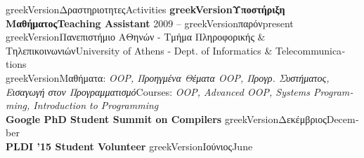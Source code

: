 \documentclass[a4paper]{resume}
\newcommand{\tl}{\textlatin}
\newcommand{\dual}[2]{\ifcsname greekVersion\endcsname #2\else\textlatin{#1}\fi}
\begin{document}

\begin{rSection}{\dual{Activities}{Δραστηριοτητες}}
  {\bf\dual{Teaching Assistant}{Υποστήριξη Μαθήματος}} \hfill {2009 -- \dual{present}{παρόν}} \\
  \dual{University of Athens - Dept. of Informatics \& Telecommunications}
  {Πανεπιστήμιο ΑΘηνών - Τμήμα Πληροφορικής \& Τηλεπικοινωνιών} \\
  \dual{Courses: \emph{OOP, Advanced OOP, Systems Programming, Introduction to Programming}}
  {Μαθήματα: \emph{\tl{OOP}, Προηγμένα Θέματα \tl{OOP}, Προγρ. Συστήματος, Εισαγωγή στον Προγραμματισμό}} \\
  {\bf\tl{Google PhD Student Summit on Compilers}} \hfill {\dual{December}{Δεκέμβριος} 2016} \\
  {\bf\tl{PLDI '15 Student Volunteer}} \hfill {\dual{June}{Ιούνιος} 2015} \\
\end{rSection}
\end{document}
